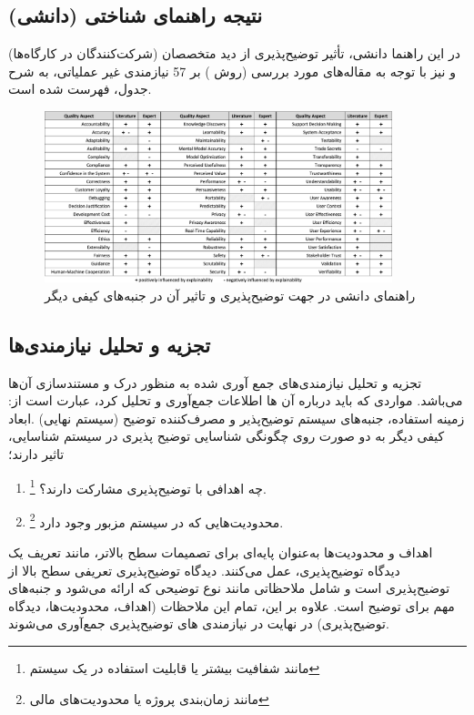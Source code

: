 \subsection{نتیجه راهنمای شناختی (دانشی)}

در این راهنما دانشی، تأثیر توضیح‌پذیری از دید متخصصان (شرکت‌کنندگان در
کارگاه‌ها) و نیز با توجه به مقاله‌های مورد بررسی (روش ) بر 57 نیازمندی
غیر عملیاتی، به شرح جدول، فهرست شده است. 

\begin{figure}[H]
    \centering
    \includegraphics[width=0.9\textwidth]{images/knowledge_catalogue.png}
    \caption{راهنمای دانشی در جهت توضیح‌پذیری و تاثیر آن در جنبه‌های کیفی دیگر}
    \label{fig:resultOfKnowledgeCatalogue}
\end{figure}

\subsection{تجزیه و تحلیل نیازمندی‌ها}

تجزیه و تحلیل نیازمندی‌های جمع آوری شده به منظور درک و مستندسازی آن‌ها می‌باشد.
مواردی که باید درباره آن ها اطلاعات جمع‌آوری و تحلیل کرد، عبارت است از: زمینه
استفاده، جنبه‌های سیستم توضیح‌پذیر و مصرف‌کننده توضیح (سیستم نهایی) .ابعاد کیفی
دیگر به دو صورت روی چگونگی شناسایی توضیح پذیری در سیستم شناسایی، تاثیر دارند؛  

\begin{enumerate}
    \item چه اهدافی با توضیح‌پذیری مشارکت دارند؟ \footnote{مانند شفافیت بیشتر یا
    قابلیت استفاده در یک سیستم}.
    \item محدودیت‌هایی که در سیستم مزبور وجود دارد \footnote{مانند زمان‌بندی
    پروژه یا محدودیت‌های مالی}.
\end{enumerate}

اهداف و محدودیت‌ها به‌عنوان پایه‌ای برای تصمیمات سطح بالاتر، مانند تعریف یک
دیدگاه توضیح‌پذیری، عمل می‌کنند. دیدگاه توضیح‌پذیری تعریفی سطح بالا از
توضیح‌پذیری است و شامل ملاحظاتی مانند نوع توضیحی که ارائه می‌شود و جنبه‌های مهم
برای توضیح است. علاوه بر این، تمام این ملاحظات (اهداف، محدودیت‌ها، دیدگاه
توضیح‌پذیری) در نهایت در نیازمندی های توضیح‌پذیری جمع‌آوری می‌شوند.

